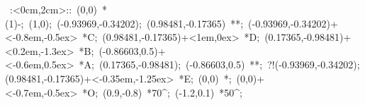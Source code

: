 %


\hbox{
\xy    <2cm,0cm>:<0cm,2cm>::
       (0,0) *\ellipse(1){-}; (1,0); 
       (-0.93969,-0.34202); (0.98481,-0.17365) **\dir{-}; 
       (-0.93969,-0.34202)+<-0.8em,-0.5ex> *{C}; 
       (0.98481,-0.17365)+<1em,0ex> *{D}; 
       (0.17365,-0.98481)+<0.2em,-1.3ex> *{B}; 
       (-0.86603,0.5)+<-0.6em,0.5ex> *{A}; 
       (0.17365,-0.98481); (-0.86603,0.5) **\dir{-};
  ?!{(-0.93969,-0.34202);(0.98481,-0.17365)}+<-0.35em,-1.25ex> 
                  *{E};
       (0,0) *{\bullet}; (0,0)+<-0.7em,-0.5ex> *{O};
       (0.9,-0.8) *{70^\circ};  (-1.2,0.1) *{50^\circ};
\endxy}



